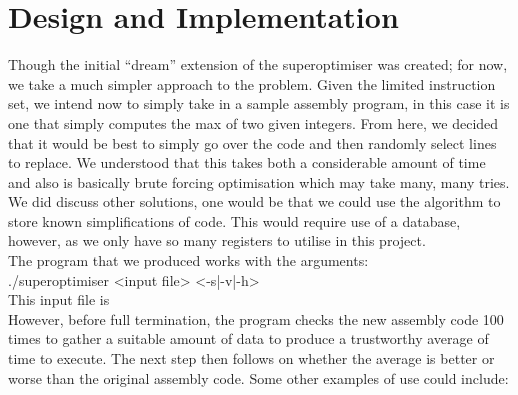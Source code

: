 \documentclass[11pt]{article}
\begin{document}
\section{Design and Implementation}
\indent Though the initial “dream” extension of the superoptimiser was created; for now, we take a much simpler approach to the problem. Given the limited instruction set, we intend now to simply take in a sample assembly program, in this case it is one that simply computes the max of two given integers. From here, we decided that it would be best to simply go over the code and then randomly select lines to replace. We understood that this takes both a considerable amount of time and also is basically brute forcing optimisation which may take many, many tries. We did discuss other solutions, one would be that we could use the algorithm to store known simplifications of code. This would require use of a database, however, as we only have so many registers to utilise in this project. 
\\
\indent The program that we produced works with the arguments:
\\ ./superoptimiser <input file> <-s|-v|-h>
\\ This input file is 
\\
\indent However, before full termination, the program checks the new assembly code 100 times to gather a suitable amount of data to produce a trustworthy average of time to execute. The next step then follows on whether the average is better or worse than the original assembly code.
Some other examples of use could include:
\end{document}
